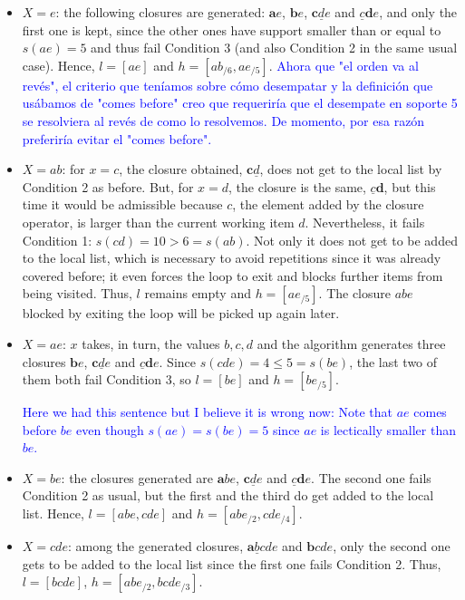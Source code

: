 \documentclass{article}
\newcommand{\added}[1]{\textcolor{blue}{#1}}
\def\s{\mathit{s}}
\begin{document}
\begin{itemize}
\item $X=e$: the following closures are generated: 
$\textbf{a}e$, $\textbf{b}e$, $\textbf{c}\underline{d}e$ 
and $\underline{c}\textbf{d}e$, and only the first one is 
kept, since the other ones have support smaller than or 
equal to $\s(ae) = 5$ and thus fail Condition 3
(and also Condition 2 in the same usual case). 
Hence, $l=[ae]$ and $h=[ab_{/6}, ae_{/5}]$. \added{Ahora que 
"el orden va al revés", el criterio que teníamos sobre cómo
desempatar y la definición que usábamos de "comes before"
creo que requeriría que el desempate en soporte 5 se
resolviera al revés de como lo resolvemos. De momento,
por esa razón preferiría evitar el "comes before".}

\item $X=ab$: for $x=c$, the closure obtained, 
$\textbf{c}\underline{d}$, does not get to the local list 
by Condition 2 as before. But, for $x=d$, the closure is 
the same, $\underline{c}\textbf{d}$, but this time it would be 
admissible because $c$, the element added by the closure 
operator, is larger than the current working item $d$. 
Nevertheless, it fails Condition 1: $\s(cd)=10>6=\s(ab)$.
Not only it does not get to be added to the local list, 
which is necessary to avoid repetitions since it was
already covered before; it even forces the loop to exit 
and blocks further items from being visited. Thus, $l$ 
remains empty and $h=[ae_{/5}]$. The closure $abe$
blocked by exiting the loop will be picked up again 
later.

\item $X=ae$: $x$ takes, in turn, the values $b, c, d$ 
and the algorithm generates three closures $\textbf{b}e$, 
$\textbf{c}\underline{d}e$ and $\underline{c}\textbf{d}e$. 
Since $\s(cde)=4 \leq 5=\s(be)$, the last two of them both 
fail Condition 3, so $l=[be]$ and $h=[be_{/5}]$. 

\added{Here we had this sentence but I believe it is 
wrong now: Note that $ae$ comes before $be$ even though 
$\s(ae)=\s(be)=5$ since $ae$ is lectically smaller than $be$.}

\item $X=be$: the closures generated are $\textbf{a}be$, 
$\textbf{c}\underline{d}e$ and $\underline{c}\textbf{d}e$. 
The second one fails Condition 2 as usual, but the first 
and the third do get added to the local list. Hence, 
$l=[abe, cde]$ and $h=[abe_{/2}, cde_{/4}]$.

\item $X=cde$: among the generated closures, 
$\textbf{a}\underline{b}cde$ and $\textbf{b}cde$, 
only the second one gets to be added to the local list 
since the first one fails Condition 2. 
Thus, $l=[bcde]$, $h=[abe_{/2}, bcde_{/3}]$.


\end{itemize}
\end{document}
